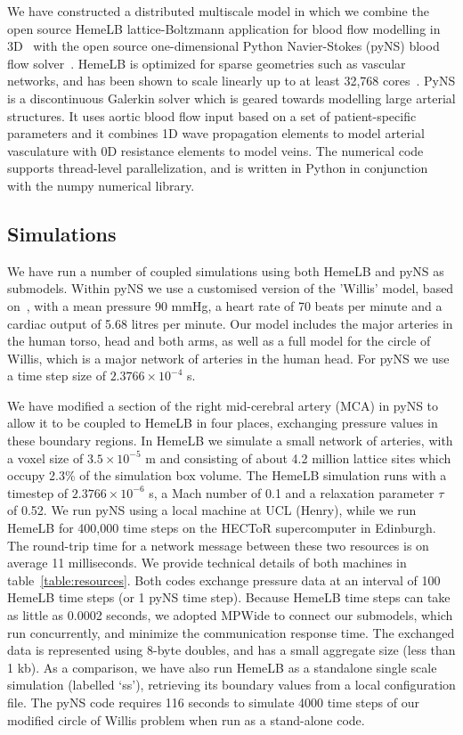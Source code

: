 \documentclass[a4,10pt]{article}
\begin{document}
We have constructed a distributed multiscale model in which we combine the open
source HemeLB lattice-Boltzmann application for blood flow modelling in
3D~\cite{Mazzeo:2008,Carver:2012} with the open source one-dimensional Python Navier-Stokes
(pyNS) blood flow solver~\cite{Botti:2010}. HemeLB is optimized for sparse
geometries such as vascular networks, and has been shown to scale linearly up
to at least 32,768 cores~\cite{Groen:2012}.  PyNS is a discontinuous Galerkin
solver which is geared towards modelling large arterial structures.  It uses
aortic blood flow input based on a set of patient-specific parameters and it
combines 1D wave propagation elements to model arterial vasculature with 0D
resistance elements to model veins. The numerical code supports thread-level
parallelization, and is written in Python in conjunction with the numpy
numerical library.

\subsection{Simulations}

We have run a number of coupled simulations using both HemeLB and pyNS as
submodels. Within pyNS we use a customised version of the 'Willis' model, based
on~\cite{Mulder:2011}, with a mean pressure 90 mmHg, a heart rate of 70 beats
per minute and a cardiac output of 5.68 litres per minute. Our model includes the
major arteries in the human torso, head and both arms, as well as a full model
for the circle of Willis, which is a major network of arteries in the human
head. For pyNS we use a time step size of $2.3766 \times 10^{-4}$ s.

We have modified a section of the right mid-cerebral artery (MCA) in pyNS to
allow it to be coupled to HemeLB in four places, exchanging pressure values in
these boundary regions. In HemeLB we simulate a small network of arteries, with
a voxel size of $3.5 \times 10^{-5}$ m and consisting of about 4.2 million
lattice sites which occupy 2.3\% of the simulation box volume. The HemeLB
simulation runs with a timestep of $2.3766 \times 10^{-6}$ s, a Mach number of
0.1 and a relaxation parameter $\tau$ of 0.52. We run pyNS using a local
machine at UCL (Henry), while we run HemeLB for 400,000 time steps on the
HECToR supercomputer in Edinburgh. The round-trip time for a network message
between these two resources is on average 11 milliseconds. We provide technical
details of both machines in table~\ref{table:resources}.  Both codes exchange pressure data at an
interval of 100 HemeLB time steps (or 1 pyNS time step). Because HemeLB time 
steps can take as little as 0.0002 seconds, we adopted MPWide to connect our submodels,
which run concurrently, and minimize the communication response time. The  exchanged 
data is represented using 8-byte doubles, and has a small
aggregate  size (less than 1 kb).  As a comparison, we have also run HemeLB as a standalone 
single scale simulation (labelled `ss'), retrieving its boundary values from a local configuration file. The pyNS code
requires 116 seconds to simulate 4000 time steps of our modified circle of
Willis problem when run as a stand-alone code.
\end{document}
